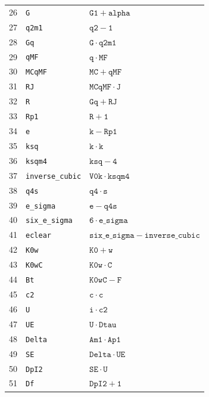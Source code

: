 \begin{longtable}{rll}
26 & \texttt{G} & $\mathtt{G1} + \mathtt{alpha}$ \\
27 & \texttt{q2m1} & $\mathtt{q2} - \mathtt{1}$ \\
28 & \texttt{Gq} & $\mathtt{G} \mathbin{\cdot} \mathtt{q2m1}$ \\
29 & \texttt{qMF} & $\mathtt{q} \mathbin{\cdot} \mathtt{MF}$ \\
30 & \texttt{MCqMF} & $\mathtt{MC} + \mathtt{qMF}$ \\
31 & \texttt{RJ} & $\mathtt{MCqMF} \mathbin{\cdot} \mathtt{J}$ \\
32 & \texttt{R} & $\mathtt{Gq} + \mathtt{RJ}$ \\
33 & \texttt{Rp1} & $\mathtt{R} + \mathtt{1}$ \\
34 & \texttt{e} & $\mathtt{k} - \mathtt{Rp1}$ \\
35 & \texttt{ksq} & $\mathtt{k} \mathbin{\cdot} \mathtt{k}$ \\
36 & \texttt{ksqm4} & $\mathtt{ksq} - \mathtt{4}$ \\
37 & \texttt{inverse\_cubic} & $\mathtt{V0k} \mathbin{\cdot} \mathtt{ksqm4}$ \\
38 & \texttt{q4s} & $\mathtt{q4} \mathbin{\cdot} \mathtt{s}$ \\
39 & \texttt{e\_sigma} & $\mathtt{e} - \mathtt{q4s}$ \\
40 & \texttt{six\_e\_sigma} & $\mathtt{6} \mathbin{\cdot} \mathtt{e\_sigma}$ \\
41 & \texttt{eclear} & $\mathtt{six\_e\_sigma} - \mathtt{inverse\_cubic}$ \\
42 & \texttt{K0w} & $\mathtt{K0} + \mathtt{w}$ \\
43 & \texttt{K0wC} & $\mathtt{K0w} \mathbin{\cdot} \mathtt{C}$ \\
44 & \texttt{Bt} & $\mathtt{K0wC} - \mathtt{F}$ \\
45 & \texttt{c2} & $\mathtt{c} \mathbin{\cdot} \mathtt{c}$ \\
46 & \texttt{U} & $\mathtt{i} \mathbin{\cdot} \mathtt{c2}$ \\
47 & \texttt{UE} & $\mathtt{U} \mathbin{\cdot} \mathtt{Dtau}$ \\
48 & \texttt{Delta} & $\mathtt{Am1} \mathbin{\cdot} \mathtt{Ap1}$ \\
49 & \texttt{SE} & $\mathtt{Delta} \mathbin{\cdot} \mathtt{UE}$ \\
50 & \texttt{DpI2} & $\mathtt{SE} \mathbin{\cdot} \mathtt{U}$ \\
51 & \texttt{Df} & $\mathtt{DpI2} + \mathtt{1}$ \\

\end{longtable}
